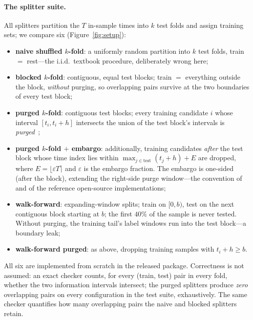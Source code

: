 \documentclass[11pt]{article}
\begin{document}
\paragraph{The splitter suite.} All splitters partition the $T$ in-sample
times into $k$ test folds and assign training sets; we compare six
(Figure~\ref{fig:setup}):
\begin{itemize}\itemsep2pt
\item \textbf{naive shuffled $k$-fold}: a uniformly random partition into $k$
test folds, train $=$ rest---the i.i.d.\ textbook procedure, deliberately
wrong here;
\item \textbf{blocked $k$-fold}: contiguous, equal test blocks; train $=$
everything outside the block, \emph{without} purging, so overlapping pairs
survive at the two boundaries of every test block;
\item \textbf{purged $k$-fold}: contiguous test blocks; every training
candidate $i$ whose interval $[t_i, t_i+h]$ intersects the union of the test
block's intervals is \emph{purged}~\citep{lopezdeprado2018advances};
\item \textbf{purged $k$-fold $+$ embargo}: additionally, training candidates
\emph{after} the test block whose time index lies within
$\max_{j \in \text{test}}(t_j + h) + E$ are dropped, where
$E = \lfloor \varepsilon T \rceil$ and $\varepsilon$ is the embargo fraction.
The embargo is one-sided (after the block), extending the right-side purge
window---the convention of \citet{lopezdeprado2018advances} and of the
reference open-source implementations;
\item \textbf{walk-forward}: expanding-window splits; train on $[0, b)$, test
on the next contiguous block starting at $b$; the first $40\%$ of the sample
is never tested. Without purging, the training tail's label windows run into
the test block---a boundary leak;
\item \textbf{walk-forward purged}: as above, dropping training samples with
$t_i + h \geq b$.
\end{itemize}
All six are implemented from scratch in the released package. Correctness is
not assumed: an exact checker counts, for every (train, test) pair in every
fold, whether the two information intervals intersect; the purged splitters
produce \emph{zero} overlapping pairs on every configuration in the test
suite, exhaustively. The same checker quantifies how many overlapping pairs
the naive and blocked splitters retain.
\end{document}
